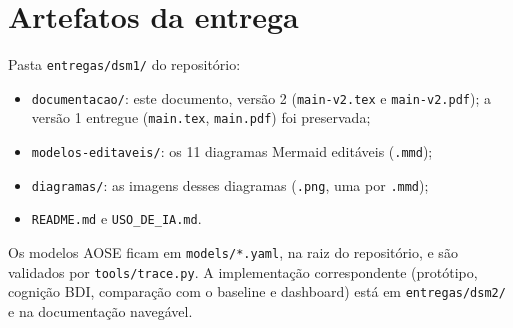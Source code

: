 \documentclass[10pt,a4paper]{article}
\newcommand{\code}[1]{\texttt{#1}}
\begin{document}
\section*{Artefatos da entrega}
Pasta \code{entregas/dsm1/} do repositório:
\begin{itemize}
  \item \code{documentacao/}: este documento, versão 2 (\code{main-v2.tex} e \code{main-v2.pdf}); a versão 1 entregue
        (\code{main.tex}, \code{main.pdf}) foi preservada;
  \item \code{modelos-editaveis/}: os 11 diagramas Mermaid editáveis (\code{.mmd});
  \item \code{diagramas/}: as imagens desses diagramas (\code{.png}, uma por \code{.mmd});
  \item \code{README.md} e \code{USO\_DE\_IA.md}.
\end{itemize}
Os modelos AOSE ficam em \code{models/*.yaml}, na raiz do repositório, e são validados por \code{tools/trace.py}.
A implementação correspondente (protótipo, cognição BDI, comparação com o baseline e dashboard) está em
\code{entregas/dsm2/} e na documentação navegável.
\end{document}
